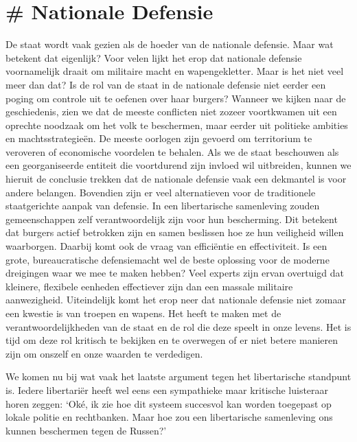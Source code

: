 \documentclass[
  a5paper,
  smalldemyvopaper,10pt,twoside,onecolumn,openright,extrafontsizes,hidelinks]{memoir}
\begin{document}
\section{\# Nationale Defensie}\label{nationale-defensie}

De staat wordt vaak gezien als de hoeder van de nationale defensie. Maar
wat betekent dat eigenlijk? Voor velen lijkt het erop dat nationale
defensie voornamelijk draait om militaire macht en wapengekletter. Maar
is het niet veel meer dan dat? Is de rol van de staat in de nationale
defensie niet eerder een poging om controle uit te oefenen over haar
burgers? Wanneer we kijken naar de geschiedenis, zien we dat de meeste
conflicten niet zozeer voortkwamen uit een oprechte noodzaak om het volk
te beschermen, maar eerder uit politieke ambities en machtsstrategieën.
De meeste oorlogen zijn gevoerd om territorium te veroveren of
economische voordelen te behalen. Als we de staat beschouwen als een
georganiseerde entiteit die voortdurend zijn invloed wil uitbreiden,
kunnen we hieruit de conclusie trekken dat de nationale defensie vaak
een dekmantel is voor andere belangen. Bovendien zijn er veel
alternatieven voor de traditionele staatgerichte aanpak van defensie. In
een libertarische samenleving zouden gemeenschappen zelf
verantwoordelijk zijn voor hun bescherming. Dit betekent dat burgers
actief betrokken zijn en samen beslissen hoe ze hun veiligheid willen
waarborgen. Daarbij komt ook de vraag van efficiëntie en effectiviteit.
Is een grote, bureaucratische defensiemacht wel de beste oplossing voor
de moderne dreigingen waar we mee te maken hebben? Veel experts zijn
ervan overtuigd dat kleinere, flexibele eenheden effectiever zijn dan
een massale militaire aanwezigheid. Uiteindelijk komt het erop neer dat
nationale defensie niet zomaar een kwestie is van troepen en wapens. Het
heeft te maken met de verantwoordelijkheden van de staat en de rol die
deze speelt in onze levens. Het is tijd om deze rol kritisch te bekijken
en te overwegen of er niet betere manieren zijn om onszelf en onze
waarden te verdedigen.

We komen nu bij wat vaak het laatste argument tegen het libertarische
standpunt is. Iedere libertariër heeft wel eens een sympathieke maar
kritische luisteraar horen zeggen: `Oké, ik zie hoe dit systeem
succesvol kan worden toegepast op lokale politie en rechtbanken. Maar
hoe zou een libertarische samenleving ons kunnen beschermen tegen de
Russen?'
\end{document}
